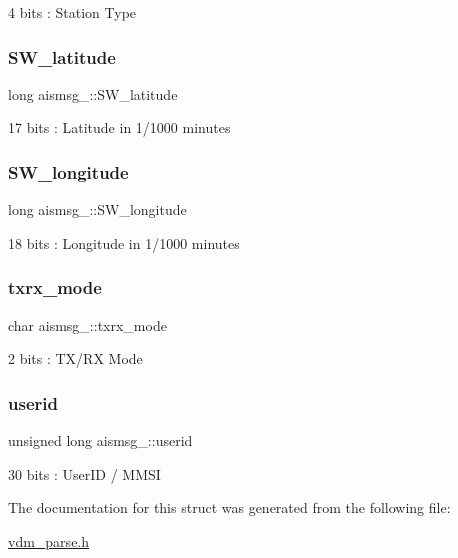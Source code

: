 4 bits \+: Station Type 

\mbox{\label{structaismsg__23_ac822afe7a2821e10a09e007e55616ad4}} 
\subsubsection{\texorpdfstring{S\+W\+\_\+latitude}{SW\_latitude}}
{\footnotesize\ttfamily long aismsg\+\_\+::\+S\+W\+\_\+latitude}



17 bits \+: Latitude in 1/1000 minutes 

\mbox{\label{structaismsg__23_aee9f9133a81157e690760c342c13ea73}} 
\subsubsection{\texorpdfstring{S\+W\+\_\+longitude}{SW\_longitude}}
{\footnotesize\ttfamily long aismsg\+\_\+::\+S\+W\+\_\+longitude}



18 bits \+: Longitude in 1/1000 minutes 

\mbox{\label{structaismsg__23_a840683386b370ac6b11d9dce20a31f7c}} 
\subsubsection{\texorpdfstring{txrx\+\_\+mode}{txrx\_mode}}
{\footnotesize\ttfamily char aismsg\+\_\+::txrx\+\_\+mode}



2 bits \+: T\+X/\+RX Mode 

\mbox{\label{structaismsg__23_a862fd5d6fb56e83c1f4aef145ac4850a}} 
\subsubsection{\texorpdfstring{userid}{userid}}
{\footnotesize\ttfamily unsigned long aismsg\+\_\+::userid}



30 bits \+: User\+ID / M\+M\+SI 



The documentation for this struct was generated from the following file\+:\begin{DoxyCompactItemize}
\item 
\mbox{\hyperlink{vdm__parse_8h}{vdm\+\_\+parse.\+h}}\end{DoxyCompactItemize}
